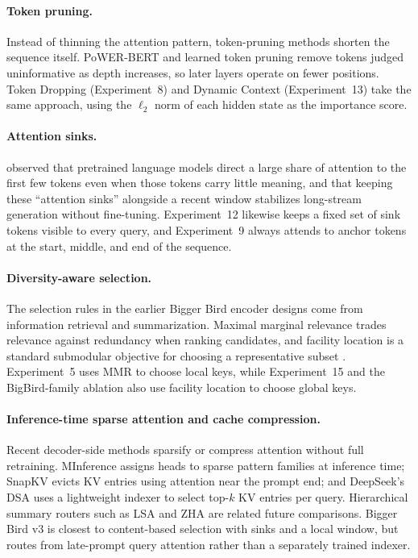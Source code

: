 \documentclass[11pt]{article}
\begin{document}
\paragraph{Token pruning.}
Instead of thinning the attention pattern, token-pruning methods shorten the
sequence itself. PoWER-BERT \citep{goyal2020powerbert} and learned token
pruning \citep{kim2021tokenpruning} remove tokens judged uninformative as
depth increases, so later layers operate on fewer positions. Token Dropping
(Experiment~8) and Dynamic Context (Experiment~13) take the same approach,
using the $\ell_2$ norm of each hidden state as the importance score.

\paragraph{Attention sinks.}
\citet{xiao2024streamingllm} observed that pretrained language models direct
a large share of attention to the first few tokens even when those tokens
carry little meaning, and that keeping these ``attention sinks'' alongside a
recent window stabilizes long-stream generation without fine-tuning.
Experiment~12 likewise keeps a fixed set of sink tokens visible to every
query, and Experiment~9 always attends to anchor tokens at the start, middle,
and end of the sequence.

\paragraph{Diversity-aware selection.}
The selection rules in the earlier Bigger Bird encoder designs come from
information retrieval and summarization. Maximal marginal relevance
\citep{carbonell1998mmr} trades relevance against redundancy when ranking
candidates, and facility location is a standard submodular objective for
choosing a representative subset \citep{lin2011submodular}. Experiment~5 uses
MMR to choose local keys, while Experiment~15 and the BigBird-family ablation
also use facility location to choose global keys.

\paragraph{Inference-time sparse attention and cache compression.}
Recent decoder-side methods sparsify or compress attention without full
retraining. MInference assigns heads to sparse pattern families at inference
time; SnapKV evicts KV entries using attention near the prompt end; and
DeepSeek's DSA uses a lightweight indexer to select top-$k$ KV entries per
query. Hierarchical summary routers such as LSA and ZHA are related future
comparisons. Bigger Bird v3 is closest to content-based selection with sinks
and a local window, but routes from late-prompt query attention rather than a
separately trained indexer.
\end{document}
